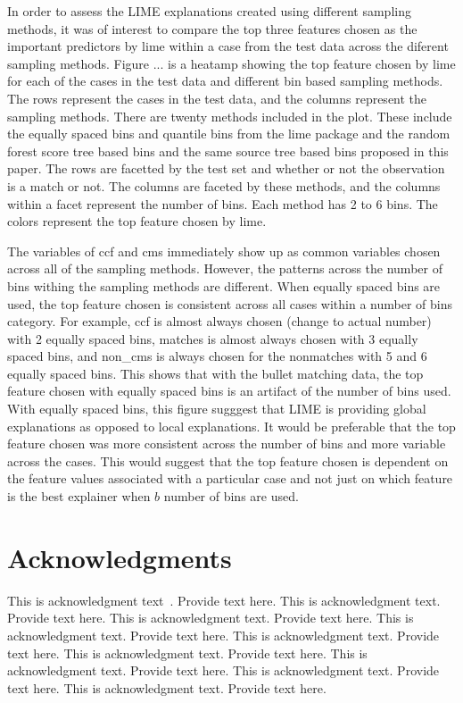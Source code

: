 \documentclass[AMS,STIX1COL]{WileyNJD-v2}
\begin{document}
In order to assess the LIME explanations created using different sampling methods, it was of interest to compare the top three features chosen as the important predictors by lime within a case from the test data across the diferent sampling methods. Figure ... is a heatamp showing the top feature chosen by lime for each of the cases in the test data and different bin based sampling methods. The rows represent the cases in the test data, and the columns represent the sampling methods. There are twenty methods included in the plot. These include the equally spaced bins and quantile bins from the lime package and the random forest score tree based bins and the same source tree based bins proposed in this paper. The rows are facetted by the test set and whether or not the observation is a match or not. The columns are faceted by these methods, and the columns within a facet represent the number of bins. Each method has 2 to 6 bins. The colors represent the top feature chosen by lime.

The variables of ccf and cms immediately show up as common variables chosen across all of the sampling methods. However, the patterns across the number of bins withing the sampling methods are different. When equally spaced bins are used, the top feature chosen is consistent across all cases within a number of bins category. For example, ccf is almost always chosen (change to actual number) with 2 equally spaced bins, matches is almost always chosen with 3 equally spaced bins, and non\_cms is always chosen for the nonmatches with 5 and 6 equally spaced bins. This shows that with the bullet matching data, the top feature chosen with equally spaced bins is an artifact of the number of bins used. With equally spaced bins, this figure sugggest that LIME is providing global explanations as opposed to local explanations. It would be preferable that the top feature chosen was more consistent across the number of bins and more variable across the cases. This would suggest that the top feature chosen is dependent on the feature values associated with a particular case and not just on which feature is the best explainer when $b$ number of bins are used.


\section*{Acknowledgments}
This is acknowledgment text~\cite{Elbaum2002}. Provide text here. This is acknowledgment text. Provide text here. This is acknowledgment text. Provide text here. This is acknowledgment text. Provide text here. This is acknowledgment text. Provide text here. This is acknowledgment text. Provide text here. This is acknowledgment text. Provide text here. This is acknowledgment text. Provide text here. This is acknowledgment text. Provide text here. 
\end{document}
